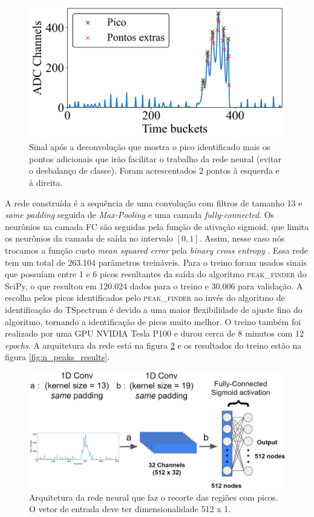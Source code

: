 \documentclass[a4paper,12pt,oneside]{book}
\begin{document}
\begin{figure}[H]
    \centering
    \includegraphics[scale = 0.6]{figs/np_ex1.png}
    \caption{Sinal após a deconvolução que mostra o pico identificado mais os pontos adicionais que irão facilitar o trabalho da rede neural (evitar o desbalanço de classe). Foram acrescentados 2 pontos à esquerda e à direita.}
    \label{fig:n_peaks_exs}
\end{figure}

\par A rede construída é a sequência de uma convolução com filtros de tamanho 13 e \textit{same padding} seguida de \textit{Max-Pooling} e uma camada \textit{fully-connected}. Os neurônios na camada FC são seguidas pela função de ativação sigmoid, que limita os neurônios da camada de saída no intervalo $[0,1]$. Assim, nesse caso nós trocamos a função custo \textit{mean squared error} pela \textit{binary cross entropy} \cite{mlbook}. Essa rede tem um total de 263.104 parâmetros treináveis. Para o treino foram usados sinais que possuíam entre 1 e 6 picos resultantes da saída do algoritmo \textsc{peak\_finder} do SciPy, o que resultou em 120.024 dados para o treino e 30.006 para validação. A escolha pelos picos identificados pelo \textsc{peak\_finder} ao invés do algoritmo de identificação do TSpectrum é devido a uma maior flexibilidade de ajuste fino do algoritmo, tornando a identificação de picos muito melhor\cite{FORTINO2022166497}. O treino também foi realizado por uma GPU NVIDIA Tesla P100 e durou cerca de 8 minutos com 12 \textit{epochs}. A arquitetura da rede está na figura \ref{fig:arq:n_peaks} e os resultados do treino estão na figura \ref{fig:n_peaks_results}.

\begin{figure}[H]
    \centering
    \includegraphics[scale = 0.35]{figs/n_peaks.png}
    \caption{Arquitetura da rede neural que faz o recorte das regiões com picos. O vetor de entrada deve ter dimensionalidade 512 x 1.}
    \label{fig:arq:n_peaks}
\end{figure}
\end{document}
